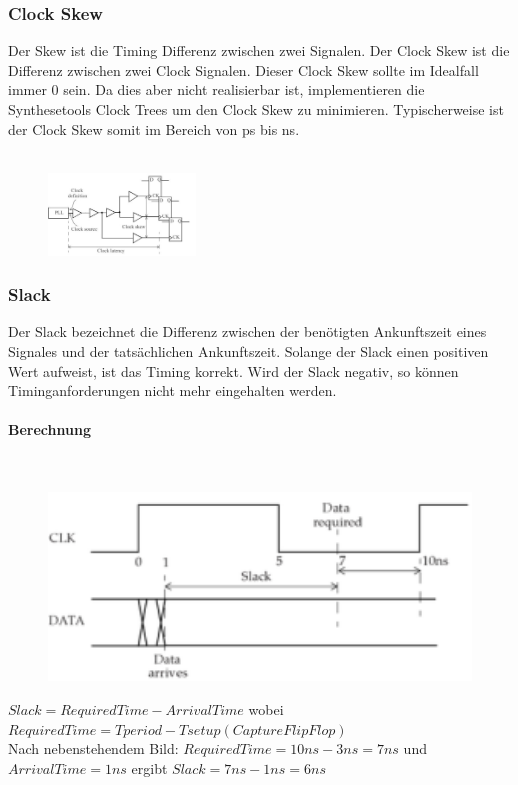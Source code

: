\begin{multicols}{2}
    \subsubsection{Clock Skew}
    Der Skew ist die Timing Differenz zwischen zwei Signalen. Der Clock Skew ist die Differenz zwischen zwei Clock Signalen. Dieser Clock Skew sollte im Idealfall immer 0 sein. Da dies aber nicht realisierbar ist, implementieren die Synthesetools Clock Trees um den Clock Skew zu minimieren. Typischerweise ist der Clock Skew somit im Bereich von ps bis ns.
    \ \\ \ \\
    \begin{figure}[H]
        \includegraphics[width=0.35\textwidth]{images/clock_skew.png}
    \end{figure}
\end{multicols}

\subsubsection{Slack}
Der Slack bezeichnet die Differenz zwischen der benötigten Ankunftszeit eines Signales und der tatsächlichen Ankunftszeit. Solange der Slack einen positiven Wert aufweist, ist das Timing korrekt. Wird der Slack negativ, so können Timinganforderungen nicht mehr eingehalten werden.

\paragraph{Berechnung}$~$ \\
\begin{minipage}{0.3\textwidth}
    \begin{figure}[H]
        \includegraphics[width=1\textwidth]{images/slack.png}
    \end{figure}
\end{minipage}
\hfill
\begin{minipage}{0.65\textwidth}
    $Slack=RequiredTime-ArrivalTime$ wobei $RequiredTime=Tperiod-Tsetup(CaptureFlipFlop)$ \\
    Nach nebenstehendem Bild: $RequiredTime=10ns-3ns=7ns$ und $ArrivalTime=1ns$ ergibt $Slack=7ns-1ns=6ns$
\end{minipage}

